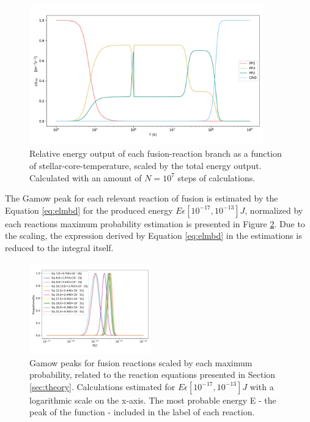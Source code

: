 \documentclass[10pt, nofootinbib, twocolumn]{revtex4-1}
\begin{document}
\begin{figure}
    \centering
    \includegraphics[width = 0.9\textwidth]{figures/energy.pdf} 
    \caption{Relative energy output of each fusion-reaction branch as a function of stellar-core-temperature, scaled by the total energy output. Calculated with an amount of $N=10^7$ steps of calculations.}
    \label{fig:enprod}
\end{figure} 

\newpage
The Gamow peak for each relevant reaction of fusion is estimated by the Equation \eqref{eq:elmbd} for the produced energy $E\epsilon [10^{-17}, 10^{-13}]J$, normalized by each reactions maximum probability estimation is presented in Figure \ref{fig:prod}. Due to the scaling, the expression derived by Equation \eqref{eq:elmbd} in the estimations is reduced to the integral itself. 
\begin{figure}[H]
    \centering
    \includegraphics[width = 0.47\textwidth]{figures/peaks.pdf} 
    \caption{Gamow peaks for fusion reactions scaled by each maximum probability, related to the reaction equations presented in Section \ref{sec:theory}. Calculations estimated for $E\epsilon [10^{-17}, 10^{-13}]J$ with a logarithmic scale on the x-axis. The most probable energy E - the peak of the function - included in the label of each reaction.}
    \label{fig:prod}
\end{figure} 
\end{document}
